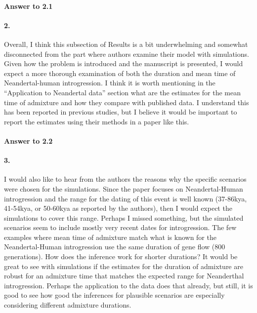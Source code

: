 \documentclass[11pt]{article}
\let\oldparagraph\paragraph
\renewcommand{\paragraph}[1]{\oldparagraph{#1}\mbox{}}
\begin{document}
\paragraph{Answer to 2.1}

\paragraph{2.}
Overall, I think this subsection of Results is a bit underwhelming and somewhat disconnected from the part where authors examine their model with simulations. Given how the problem is introduced and the manuscript is presented, I would expect a more thorough examination of both the duration and mean time of Neandertal-human introgression. I think it is worth mentioning in the “Application to Neandertal data” section what are the estimates for the mean time of admixture and how they compare with published data. I understand this has been reported in previous studies, but I believe it would be important to report the estimates using their methods in a paper like this.

\paragraph{Answer to 2.2}

\paragraph{3.}
I would also like to hear from the authors the reasons why the specific scenarios were chosen for the simulations. Since the paper focuses on Neandertal-Human introgression and the range for the dating of this event is well known (37-86kya, 41-54kya, or 50-60kya as reported by the authors), then I would expect the simulations to cover this range. Perhaps I missed something, but the simulated scenarios seem to include mostly very recent dates for introgression. The few examples where mean time of admixture match what is known for the Neandertal-Human introgression use the same duration of gene flow (800 generations). How does the inference work for shorter durations? It would be great to see with simulations if the estimates for the duration of admixture are robust for an admixture time that matches the expected range for Neanderthal introgression. Perhaps the application to the data does that already, but still, it is good to see how good the inferences for plausible scenarios are especially considering different admixture durations.
\end{document}

